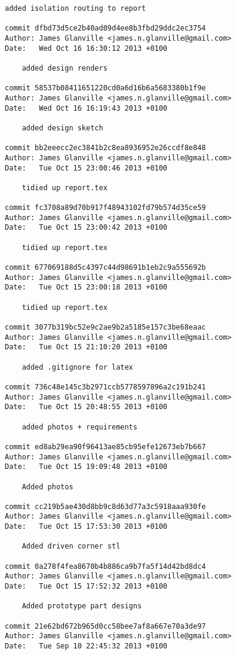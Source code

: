 \documentclass[a4paper,11pt]{article}  %
\begin{document}
\begin{lstlisting}[frame=single]
    added isolation routing to report

commit dfbd73d5ce2b40ad09d4ee8b3fbd29ddc2ec3754
Author: James Glanville <james.n.glanville@gmail.com>
Date:   Wed Oct 16 16:30:12 2013 +0100

    added design renders

commit 58537b08411651220cd0a6d16b6a5683380b1f9e
Author: James Glanville <james.n.glanville@gmail.com>
Date:   Wed Oct 16 16:19:43 2013 +0100

    added design sketch

commit bb2eeecc2ec3841b2c8ea8936952e26ccdf8e848
Author: James Glanville <james.n.glanville@gmail.com>
Date:   Tue Oct 15 23:00:46 2013 +0100

    tidied up report.tex

commit fc3708a89d70b917f48943102fd79b574d35ce59
Author: James Glanville <james.n.glanville@gmail.com>
Date:   Tue Oct 15 23:00:42 2013 +0100

    tidied up report.tex

commit 677069188d5c4397c44d98691b1eb2c9a555692b
Author: James Glanville <james.n.glanville@gmail.com>
Date:   Tue Oct 15 23:00:18 2013 +0100

    tidied up report.tex

commit 3077b319bc52e9c2ae9b2a5185e157c3be68eaac
Author: James Glanville <james.n.glanville@gmail.com>
Date:   Tue Oct 15 21:10:20 2013 +0100

    added .gitignore for latex

commit 736c48e145c3b2971ccb5778597896a2c191b241
Author: James Glanville <james.n.glanville@gmail.com>
Date:   Tue Oct 15 20:48:55 2013 +0100

    added photos + requirements

commit ed8ab29ea90f96413ae85cb95efe12673eb7b667
Author: James Glanville <james.n.glanville@gmail.com>
Date:   Tue Oct 15 19:09:48 2013 +0100

    Added photos

commit cc219b5ae430d8bb9c8d63d77a3c5918aaa930fe
Author: James Glanville <james.n.glanville@gmail.com>
Date:   Tue Oct 15 17:53:30 2013 +0100

    Added driven corner stl

commit 0a278f4fea8670b4b886ca9b7fa5f14d42bd8dc4
Author: James Glanville <james.n.glanville@gmail.com>
Date:   Tue Oct 15 17:52:32 2013 +0100

    Added prototype part designs

commit 21e62bd672b965d0cc58bee7af8a667e70a3de97
Author: James Glanville <james.n.glanville@gmail.com>
Date:   Tue Sep 10 22:45:32 2013 +0100


\end{lstlisting}
\end{document}
